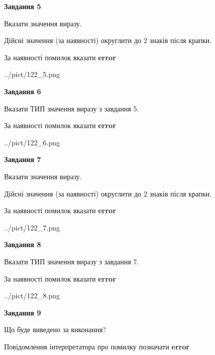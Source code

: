 \documentclass[11pt, ukrainian]{article}
\begin{document}
{\begin {large}
{\begin {center}\textbf{Завдання 5}\end {center}}\par
Вказати значення виразу. \par
Дійсні значення (за наявності) округлити до 2 знаків після крапки. \par
За наявності помилок вказати \textbf{error}

\begin{center}
	{../pict/122_5.png}
\end{center}
\newpage

{\begin {center}\textbf{Завдання 6}\end {center}}\par
Вказати ТИП значення виразу з завдання 5. \par
За наявності помилок вказати \textbf{error}

\begin{center}
	{../pict/122_6.png}
\end{center}
\newpage

{\begin {center}\textbf{Завдання 7}\end {center}}\par
Вказати значення виразу. \par
Дійсні значення (за наявності) округлити до 2 знаків після крапки. \par
За наявності помилок вказати \textbf{error}

\begin{center}
	{../pict/122_7.png}
\end{center}
\newpage

{\begin {center}\textbf{Завдання 8}\end {center}}\par
Вказати ТИП значення виразу з завдання 7. \par
За наявності помилок вказати \textbf{error}

\begin{center}
	{../pict/122_8.png}
\end{center}
\newpage

{\begin {center}\textbf{Завдання 9}\end {center}}\par
Що буде виведено за виконання? \par
Повідомлення інтерпретатора про помилку позначати \textbf{error}


\end{large}}
\end{document}

